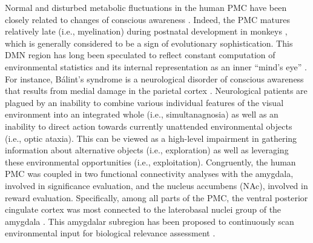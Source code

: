 \documentclass[10pt,letterpaper]{article}
\begin{document}
Normal and disturbed metabolic fluctuations in the
human PMC have been closely related to
changes of conscious awareness \citep{cavanna2006precuneus}.
Indeed,
the PMC matures relatively late (i.e., myelination) during postnatal development in monkeys
\citep{goldman1987development}, which is generally considered to
be a sign of evolutionary sophistication.
%
This DMN region has long been speculated to
reflect constant computation of
environmental statistics and its internal representation
as an inner ``mind's eye'' \citep{cavanna2006precuneus, leech_pcc2014}.
For instance, B\'alint's syndrome is a neurological disorder of conscious
awareness that results from medial damage in the parietal cortex
\citep{balint1909seelenlahmung}.
Neurological patients are plagued by an
inability to combine various individual features of the visual
environment into an integrated whole (i.e., simultanagnosia)
as well as an inability to direct action towards
currently unattended environmental objects
(i.e., optic ataxia).
This can be viewed as a high-level impairment in gathering
information about alternative objects (i.e., exploration) as well as
leveraging these environmental opportunities (i.e., exploitation).
Congruently,
the human PMC was coupled in two functional connectivity analyses
\citep{bzdok2015subspecialization}
with the amygdala, involved in significance evaluation, and
the nucleus accumbens (NAc), involved in reward evaluation.
Specifically, among all parts of the PMC,
the ventral posterior cingulate cortex was
most connected to the laterobasal
nuclei group of the amygdala
\citep{bzdok2015subspecialization}.
This amygdalar subregion has been proposed to
continuously scan environmental input
for biological relevance assessment
\citep{amygdala_bzdok}.
\end{document}
